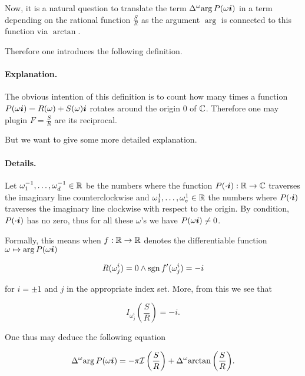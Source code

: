 \documentclass[10pt,a4paper]{article}
\begin{document}
Now, it is a natural question to translate the term $\Delta^\omega{\arg{P(\omega\boldsymbol{i})}}$ in a term depending on the rational function $\frac{S}{R}$ as the argument $\arg$ is connected to this function via $\arctan$.

Therefore one introduces the following definition. 



\paragraph{Explanation.} The obvious intention of this definition is to count how many times a function $P(\omega\boldsymbol{i})=R(\omega)+S(\omega)\boldsymbol{i}$ rotates around the origin $0$ of $\mathbb{C}$. Therefore one may plugin $F=\frac{S}{R}$ are its reciprocal.

But we want to give some more detailed explanation.

\paragraph{Details.} %
Let $\omega^{-1}_1,\ldots,\omega^{-1}_d\in\mathbb{R}$ be the numbers where the function $P(\cdot\boldsymbol{i}):\mathbb{R}\rightarrow\mathbb{C}$ traverses the imaginary line counterclockwise and $\omega^1_1,\ldots,\omega^1_e\in\mathbb{R}$ the numbers where $P(\cdot\boldsymbol{i})$ traverses the imaginary line clockwise with respect to the origin. By condition, $P(\cdot\boldsymbol{i})$ has no zero, thus for all these $\omega$'s we have $P(\omega\boldsymbol{i})\neq 0$.

Formally, this means when $f:\mathbb{R}\rightarrow\mathbb{R}$ denotes the differentiable function $\omega\mapsto\arg{P(\omega\boldsymbol{i})}$

\begin{equation}
R(\omega^i_j)=0 \wedge \operatorname{sgn}{f'(\omega^i_j)}=-i
\end{equation}

for $i=\pm 1$ and $j$ in the appropriate index set.
More, from this we see that

\begin{equation}
I_{\omega^i_j}\left(\frac{S}{R}\right)=-i\text{.}
\end{equation}

One thus may deduce the following equation

\begin{equation}
\Delta^\omega{\arg{P(\omega\boldsymbol{i})}}=-\pi\mathcal{I}\left(\frac{S}{R}\right)+\Delta^\omega{\arctan\left(\frac{S}{R}\right)}\text{.}\label{eq4}
\end{equation}
\end{document}
